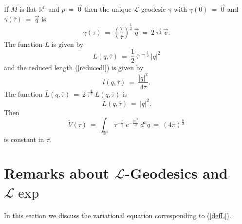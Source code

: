 \documentclass[12pt]{amsart}
\newcommand{\R}{{\mathbb R}}
\numberwithin{equation}{section}
\theoremstyle{plain}
\theoremstyle{definition}
\theoremstyle{remark}
\begin{document}
If $M$ is flat $\R^n$ and $p \: = \: \vec{0}$ then the unique
${\mathcal L}$-geodesic $\gamma$ with $\gamma(0) \: =\: \vec{0}$ and
$\gamma(\overline{\tau}) \: = \: \vec{q}$ is 
\begin{equation}
\gamma(\tau) \: = \: \left( \frac{\tau}{\overline{\tau}}
\right)^{\frac12} \: \vec{q} \: = \: 2 \: \tau^{\frac12} \: \vec{v}.
\end{equation}
The function $L$ is given by
\begin{equation}
L(q, \overline{\tau}) \: = \: \frac12 \: \overline{\tau}^{\: -
\frac12} \: |q|^2
\end{equation}
and the reduced length (\ref{reducedl}) is given by
\begin{equation}
l(q, \overline{\tau}) \: = \: \frac{|q|^2}{4 \overline{\tau}}.
\end{equation}
The function $\overline{L}(q, \overline{\tau}) \: = \:
2 \: \overline{\tau}^{\frac12} \: L(q, \overline{\tau})$
is
\begin{equation}
\overline{L}(q, \overline{\tau}) \: = \: |q|^2.
\end{equation}
Then
\begin{equation}
\tilde{V}(\tau) \: = \: 
\int_{\R^n} \tau^{-\frac{n}{2}} \: e^{-\frac{|q|^2}{4 {\tau}}} \:
d^nq \: = \: (4\pi)^{\frac{n}{2}} 
\end{equation}
is constant in $\tau$.

\section{Remarks about ${\mathcal L}$-Geodesics and 
${\mathcal L}\exp$} \label{Lremarks}

In this section we discuss the variational equation corresponding to
(\ref{defL}).
\end{document}
